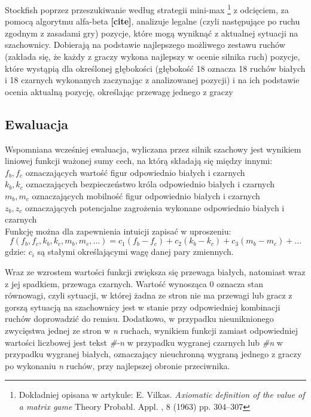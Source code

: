 \documentclass[inzynierska]{pwr_wmat_praca_dyplomowa}
\theoremstyle{plain}
\numberwithin{theorem}{chapter}
\theoremstyle{definition}
\numberwithin{theorem}{chapter}
\begin{document}
Stockfish poprzez przeszukiwanie według strategii mini-max \footnote{Dokładniej opisana w artykule: E. Vilkas. \textit{Axiomatic definition of the value of a matrix game} Theory Probabl. Appl. , 8 (1963) pp. 304–307} z odcięciem, za pomocą algorytmu alfa-beta \textbf{[cite]}, analizuje legalne (czyli następujące po ruchu zgodnym z zasadami gry) pozycje, które mogą wyniknąć z aktualnej sytuacji na szachownicy. Dobierają na podstawie najlepszego możliwego zestawu ruchów (zakłada się, że każdy z graczy wykona najlepszy w ocenie silnika ruch) pozycje, które wystąpią dla określonej głębokości (głębokość 18 oznacza 18 ruchów białych i 18 czarnych wykonanych zaczynając z analizowanej pozycji) i na ich podstawie ocenia aktualną pozycję, określając przewagę jednego z graczy

\subsection{Ewaluacja}
Wspomniana wcześniej ewaluacja, wyliczana przez silnik szachowy jest wynikiem liniowej funkcji 
ważonej sumy cech, na którą składają się między innymi:\\
$f_b,f_c$ oznaczających wartość figur odpowiednio białych i czarnych\\
$k_b,k_c$ oznaczających bezpieczeństwo króla odpowiednio białych i czarnych\\
$m_b,m_c$ oznaczających mobilność figur odpowiednio białych i czarnych\\
$z_b,z_c$ oznaczających potencjalne zagrożenia wykonane odpowiednio białych i czarnych\\


Funkcję można dla zapewnienia intuicji zapisać w uproszeniu:
\begin{equation}
	f(f_b,f_c,k_b,k_c,m_b,m_c,\dots)=c_1(f_b-f_c)+c_2(k_b-k_c)+c_3(m_b-m_c)+\dots
\end{equation}
gdzie:
$c_i$ są stałymi określającymi wagę danej pary zmiennych.

Wraz ze wzrostem wartości funkcji zwiększa się przewaga białych, natomiast wraz z jej spadkiem, przewaga czarnych. Wartość wynosząca 0 oznacza stan równowagi, czyli sytuacji, w której żadna ze stron nie ma przewagi lub gracz z gorszą sytuacją na szachownicy jest w stanie przy odpowiedniej kombinacji ruchów doprowadzić do remisu. Dodatkowo, w przypadku nieuniknionego zwycięstwa jednej ze stron w \textit{n} ruchach, wynikiem funkcji zamiast odpowiedniej wartości liczbowej jest tekst \textit{\#-n} w przypadku wygranej czarnych lub \textit{\#n} w przypadku wygranej białych, oznaczający nieuchronną wygraną jednego z graczy po wykonaniu \textit{n} ruchów, przy najlepszej obronie przeciwnika.
\end{document}
